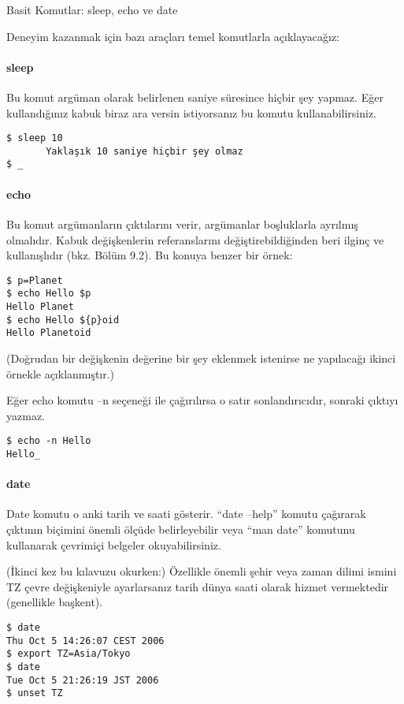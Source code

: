 \begin{section}{Basit Komutlar: sleep, echo ve date}

Deneyim kazanmak için bazı araçları temel komutlarla açıklayacağız:

\paragraph{sleep}{Bu komut argüman olarak belirlenen saniye süresince hiçbir şey yapmaz. Eğer kullandığınız kabuk biraz ara versin istiyorsanız bu komutu kullanabilirsiniz.}
\begin{verbatim}
$ sleep 10
       Yaklaşık 10 saniye hiçbir şey olmaz
$ _
\end{verbatim}
\paragraph{echo}{Bu komut argümanların çıktılarını verir, argümanlar boşluklarla ayrılmış olmalıdır. Kabuk değişkenlerin referanslarını değiştirebildiğinden
beri ilginç ve kullanışlıdır (bkz. Bölüm 9.2). Bu konuya benzer bir örnek:}
\begin{verbatim}
$ p=Planet
$ echo Hello $p
Hello Planet
$ echo Hello ${p}oid
Hello Planetoid
\end{verbatim}

(Doğrudan bir değişkenin değerine bir şey eklenmek istenirse ne yapılacağı ikinci örnekle açıklanmıştır.)

Eğer echo komutu –n seçeneği ile çağırılırsa o satır sonlandırıcıdır, sonraki çıktıyı yazmaz.
\begin{verbatim}
$ echo -n Hello
Hello_
\end{verbatim}

\paragraph{date}{Date komutu o anki tarih ve saati gösterir. “date –help” komutu çağırarak çıktının biçimini önemli ölçüde belirleyebilir veya “man date” komutunu
kullanarak çevrimiçi belgeler okuyabilirsiniz.}

(İkinci kez bu kılavuzu okurken:) Özellikle önemli şehir veya zaman dilimi ismini TZ çevre değişkeniyle ayarlarsanız tarih dünya saati olarak hizmet vermektedir (genellikle başkent).
\begin{verbatim}
$ date
Thu Oct 5 14:26:07 CEST 2006
$ export TZ=Asia/Tokyo
$ date
Tue Oct 5 21:26:19 JST 2006
$ unset TZ
\end{verbatim}


\end{section}
